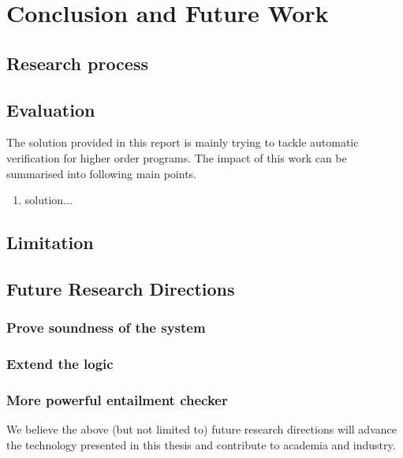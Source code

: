\chapter{Conclusion and Future Work}
\label{ch:concl}

\section{Research process}


\section{Evaluation}

The solution provided in this report is mainly trying to tackle automatic verification for higher order programs. The impact of this work can be summarised into following main points.

\begin{enumerate}
    \item solution...
\end{enumerate}


\section{Limitation}

\section{Future Research Directions}


\subsection{Prove soundness of the system}


\subsection{Extend the logic}


\subsection{More powerful entailment checker}


We believe the above (but not limited to) future research directions will advance the technology presented in this thesis and contribute to academia and industry.
